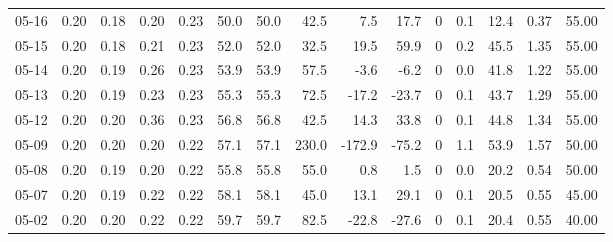 \begin{threeparttable}
{\begin{tabular}{lrrrrrrrrrrrrrr}
  05-16 &          0.20 &          0.18 &          0.20 &        0.23 &                50.0 &               50.0 &                42.5 &        7.5 &         17.7 &              0 &                 0.1 &             12.4 &            0.37 &                  55.00 \\
  05-15 &          0.20 &          0.18 &          0.21 &        0.23 &                52.0 &               52.0 &                32.5 &       19.5 &         59.9 &              0 &                 0.2 &             45.5 &            1.35 &                  55.00 \\
  05-14 &          0.20 &          0.19 &          0.26 &        0.23 &                53.9 &               53.9 &                57.5 &       -3.6 &         -6.2 &              0 &                 0.0 &             41.8 &            1.22 &                  55.00 \\
  05-13 &          0.20 &          0.19 &          0.23 &        0.23 &                55.3 &               55.3 &                72.5 &      -17.2 &        -23.7 &              0 &                 0.1 &             43.7 &            1.29 &                  55.00 \\
  05-12 &          0.20 &          0.20 &          0.36 &        0.23 &                56.8 &               56.8 &                42.5 &       14.3 &         33.8 &              0 &                 0.1 &             44.8 &            1.34 &                  55.00 \\
  05-09 &          0.20 &          0.20 &          0.20 &        0.22 &                57.1 &               57.1 &               230.0 &     -172.9 &        -75.2 &              0 &                 1.1 &             53.9 &            1.57 &                  50.00 \\
  05-08 &          0.20 &          0.19 &          0.20 &        0.22 &                55.8 &               55.8 &                55.0 &        0.8 &          1.5 &              0 &                 0.0 &             20.2 &            0.54 &                  50.00 \\
  05-07 &          0.20 &          0.19 &          0.22 &        0.22 &                58.1 &               58.1 &                45.0 &       13.1 &         29.1 &              0 &                 0.1 &             20.5 &            0.55 &                  45.00 \\
  05-02 &          0.20 &          0.20 &          0.22 &        0.22 &                59.7 &               59.7 &                82.5 &      -22.8 &        -27.6 &              0 &                 0.1 &             20.4 &            0.55 &                  40.00 \\

\end{tabular}}
\end{threeparttable}
